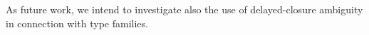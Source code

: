 \documentclass[review]{elsarticle}
\begin{document}
As future work, we intend to investigate also the use of
delayed-closure ambiguity in connection with type families.







\end{document}
